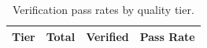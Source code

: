 \begin{table}[t]
\centering
\caption{Verification pass rates by quality tier.}
\label{tab:verification}
\begin{tabular}{lrrr}
\toprule
Tier & Total & Verified & Pass Rate \\
\midrule
\bottomrule
\end{tabular}
\end{table}
